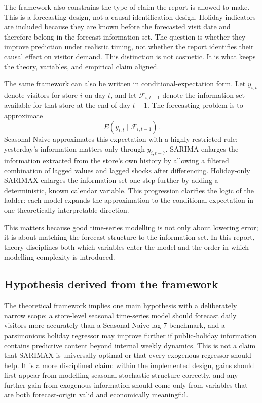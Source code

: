 \documentclass[11pt,oneside]{scrartcl}
\begin{document}
The framework also constrains the type of claim the report is allowed to make. This is a forecasting design, not a causal identification design. Holiday indicators are included because they are known before the forecasted visit date and therefore belong in the forecast information set. The question is whether they improve prediction under realistic timing, not whether the report identifies their causal effect on visitor demand. This distinction is not cosmetic. It is what keeps the theory, variables, and empirical claim aligned.

The same framework can also be written in conditional-expectation form. Let $y_{i,t}$ denote visitors for store $i$ on day $t$, and let $\mathcal{F}_{i,t-1}$ denote the information set available for that store at the end of day $t-1$. The forecasting problem is to approximate
\[
E(y_{i,t}\mid \mathcal{F}_{i,t-1}).
\]
Seasonal Naive approximates this expectation with a highly restricted rule: yesterday's information matters only through $y_{i,t-7}$. SARIMA enlarges the information extracted from the store's own history by allowing a filtered combination of lagged values and lagged shocks after differencing. Holiday-only SARIMAX enlarges the information set one step further by adding a deterministic, known calendar variable. This progression clarifies the logic of the ladder: each model expands the approximation to the conditional expectation in one theoretically interpretable direction.

This matters because good time-series modelling is not only about lowering error; it is about matching the forecast structure to the information set. In this report, theory disciplines both which variables enter the model and the order in which modelling complexity is introduced.

\subsection{Hypothesis derived from the framework}
The theoretical framework implies one main hypothesis with a deliberately narrow scope: a store-level seasonal time-series model should forecast daily visitors more accurately than a Seasonal Naive lag-7 benchmark, and a parsimonious holiday regressor may improve further if public-holiday information contains predictive content beyond internal weekly dynamics. This is not a claim that SARIMAX is universally optimal or that every exogenous regressor should help. It is a more disciplined claim: within the implemented design, gains should first appear from modelling seasonal stochastic structure correctly, and any further gain from exogenous information should come only from variables that are both forecast-origin valid and economically meaningful.
\end{document}
